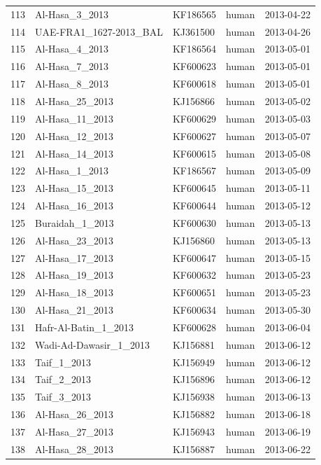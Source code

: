 \documentclass[11pt,oneside,letterpaper]{article}
\begin{document}
\begin{longtable}{ | l | l | l | l | l | }
  113 & Al-Hasa\_3\_2013 & KF186565 & human & 2013-04-22 \\
  114 & UAE-FRA1\_1627-2013\_BAL & KJ361500 & human & 2013-04-26 \\
  115 & Al-Hasa\_4\_2013 & KF186564 & human & 2013-05-01 \\
  116 & Al-Hasa\_7\_2013 & KF600623 & human & 2013-05-01 \\
  117 & Al-Hasa\_8\_2013 & KF600618 & human & 2013-05-01 \\
  118 & Al-Hasa\_25\_2013 & KJ156866 & human & 2013-05-02 \\
  119 & Al-Hasa\_11\_2013 & KF600629 & human & 2013-05-03 \\
  120 & Al-Hasa\_12\_2013 & KF600627 & human & 2013-05-07 \\
  121 & Al-Hasa\_14\_2013 & KF600615 & human & 2013-05-08 \\
  122 & Al-Hasa\_1\_2013 & KF186567 & human & 2013-05-09 \\
  123 & Al-Hasa\_15\_2013 & KF600645 & human & 2013-05-11 \\
  124 & Al-Hasa\_16\_2013 & KF600644 & human & 2013-05-12 \\
  125 & Buraidah\_1\_2013 & KF600630 & human & 2013-05-13 \\
  126 & Al-Hasa\_23\_2013 & KJ156860 & human & 2013-05-13 \\
  127 & Al-Hasa\_17\_2013 & KF600647 & human & 2013-05-15 \\
  128 & Al-Hasa\_19\_2013 & KF600632 & human & 2013-05-23 \\
  129 & Al-Hasa\_18\_2013 & KF600651 & human & 2013-05-23 \\
  130 & Al-Hasa\_21\_2013 & KF600634 & human & 2013-05-30 \\
  131 & Hafr-Al-Batin\_1\_2013 & KF600628 & human & 2013-06-04 \\
  132 & Wadi-Ad-Dawasir\_1\_2013 & KJ156881 & human & 2013-06-12 \\
  133 & Taif\_1\_2013 & KJ156949 & human & 2013-06-12 \\
  134 & Taif\_2\_2013 & KJ156896 & human & 2013-06-12 \\
  135 & Taif\_3\_2013 & KJ156938 & human & 2013-06-13 \\
  136 & Al-Hasa\_26\_2013 & KJ156882 & human & 2013-06-18 \\
  137 & Al-Hasa\_27\_2013 & KJ156943 & human & 2013-06-19 \\
  138 & Al-Hasa\_28\_2013 & KJ156887 & human & 2013-06-22 \\

\end{longtable}
\end{document}
